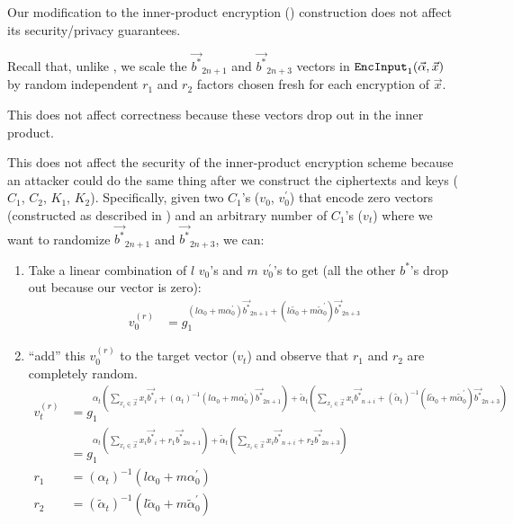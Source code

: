 \documentclass[pdftex,12pt,a4papaer,twoside,notitlepage]{report}
\DeclareMathOperator{\ein}{\mathtt{EncInput}}
\begin{document}
\begin{appendices}
Our modification to the inner-product encryption (\cite{inner-product})
construction does not affect its security/privacy guarantees.

Recall that, unlike \cite{inner-product}, we scale the $\vec{b^*}_{2n+1}$ and
$\vec{b^*}_{2n+3}$ vectors in $\ein_1(\Ap, \vec{x})$ by random independent $r_1$
and $r_2$ factors chosen fresh for each encryption of $\vec{x}$.

This does not affect correctness because these vectors drop out in the inner
product.

This does not affect the security of the inner-product encryption scheme because
an attacker could do the same thing after we construct the ciphertexts and keys
($C_1$, $C_2$, $K_1$, $K_2$). Specifically, given two $C_1$'s ($v_0$,
$v_0^\prime$) that encode zero vectors (constructed as described in
\cite{inner-product}) and an arbitrary number of $C_1$'s ($v_t$) where we want
to randomize $\vec{b^*}_{2n+1}$ and $\vec{b^*}_{2n+3}$, we can:

\begin{enumerate}
\item Take a linear combination of $l$ $v_0$'s and $m$ $v_0^\prime$'s to get
  (all the other $b^*$'s drop out because our vector is zero):
  \begin{align*}
    v_0^{(r)} &= g_1^{(l\alpha_0 + m\alpha_0^\prime) \vec{b^*}_{2n+1} + (l\tilde{\alpha_0} + m\tilde{\alpha}_0^\prime)\vec{b^*}_{2n+3}}
  \end{align*}
\item ``add'' this $v_0^{(r)}$ to the target vector ($v_t$) and observe
  that $r_1$ and $r_2$ are completely random.
  \begin{align*}
    v_t^{(r)} &= g_1^{\alpha_t(\sum_{x_i \in \vec{x}}{x_i\vec{b^*}_i} +
      (\alpha_t)^{-1}(l\alpha_0 + m\alpha_0^\prime) \vec{b^*}_{2n+1}) +
      \tilde{\alpha}_t(\sum_{x_i \in \vec{x}}{x_i\vec{b^*}_{n+i}} +
      (\tilde{\alpha}_t)^{-1}(l\tilde{\alpha}_0 +
      m\tilde{\alpha}_0^\prime)\vec{b^*}_{2n+3})} \\
              &= g_1^{\alpha_t(\sum_{x_i \in \vec{x}}{x_i\vec{b^*}_i} +
      r_1 \vec{b^*}_{2n+1}) +
      \tilde{\alpha}_t(\sum_{x_i \in \vec{x}}{x_i\vec{b^*}_{n+i}} +
      r_2 \vec{b^*}_{2n+3})} \\
    r_1 &=  (\alpha_t)^{-1}(l\alpha_0 + m\alpha_0^\prime) \\
    r_2 &=  (\tilde{\alpha}_t)^{-1}(l\tilde{\alpha}_0 + m\tilde{\alpha}_0^\prime) \\
  \end{align*}
\end{enumerate}


\end{appendices}
\end{document}
